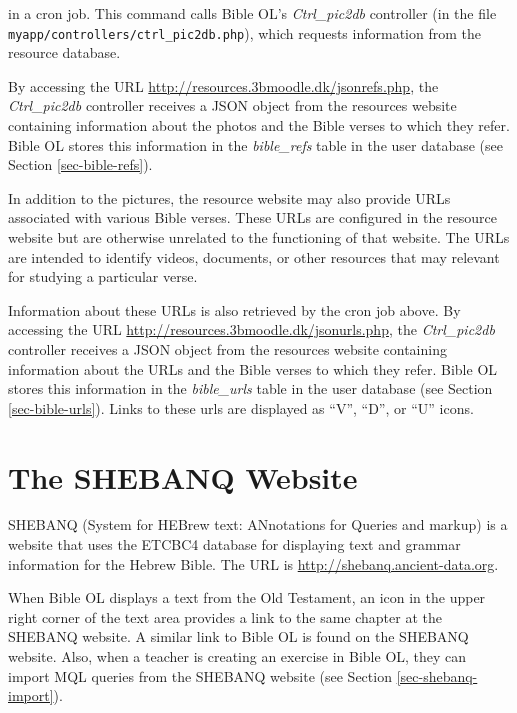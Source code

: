 \documentclass[11pt,oneside,a4paper]{memoir}
\begin{document}
\noindent
in a cron job. This command calls Bible OL's \emph{Ctrl\_pic2db} controller (in the file
\texttt{myapp/\allowbreak{}controllers/\allowbreak{}ctrl\_pic2db.php}), which requests information from the resource database.

By accessing the URL \url{http://resources.3bmoodle.dk/jsonrefs.php}, the \emph{Ctrl\_pic2db}
controller receives a JSON object from the resources website containing information about the photos
and the Bible verses to which they refer. Bible OL stores this information in the
\emph{bible\_refs} table in the user database (see Section
\ref{sec-bible-refs}).

In addition to the pictures, the resource website may also provide URLs associated with various
Bible verses. These URLs are configured in the resource website but are otherwise unrelated to the
functioning of that website. The URLs are intended to identify videos, documents, or other resources
that may relevant for studying a particular verse.

Information about these URLs is also retrieved by the cron job above. By accessing the URL
\url{http://resources.3bmoodle.dk/jsonurls.php}, the \emph{Ctrl\_pic2db} controller receives a JSON
object from the resources website containing information about the URLs and the Bible verses to
which they refer. Bible OL stores this information in the \emph{bible\_urls}%
table in the user database (see Section \ref{sec-bible-urls}). Links to these
urls are displayed as ``V'', ``D'', or ``U'' icons.

\section{The SHEBANQ Website}\label{sec-shebanq}

SHEBANQ (System for HEBrew text: ANnotations for Queries and markup) is a website that uses the
ETCBC4 database for displaying text and grammar information for the Hebrew Bible. The URL is
\url{http://shebanq.ancient-data.org}.

When Bible OL displays a text from the Old Testament, an icon in the upper right corner of the text
area provides a link to the same chapter at the SHEBANQ website. A similar link to Bible OL is found
on the SHEBANQ website. Also, when a teacher is creating an exercise in Bible OL, they can import
MQL queries from the SHEBANQ website (see Section \ref{sec-shebanq-import}).
\end{document}
